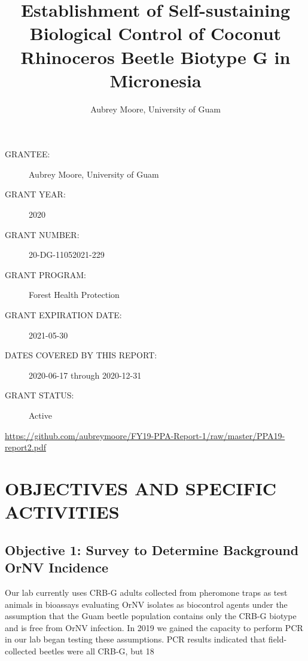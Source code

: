 \documentclass[12pt,letterpaper,english,bibliography=totocnumbered,abstract=on]{scrartcl}
\begin{document}
\titlehead{US Forest Service Forest Health Protection Grant Progess Report 1}
\title{Establishment of Self-sustaining Biological Control of Coconut Rhinoceros Beetle Biotype G in Micronesia}
\author{Aubrey Moore, University of Guam}
\maketitle
\begin{description}	
	\item[GRANTEE:] Aubrey Moore, University of Guam 
	\item[GRANT YEAR:] 2020
	\item[GRANT NUMBER:] 20-DG-11052021-229
	\item[GRANT PROGRAM:] Forest Health Protection
	\item[GRANT EXPIRATION DATE:] 2021-05-30
	\item[DATES COVERED BY THIS REPORT:] 2020-06-17 through 2020-12-31
	\item[GRANT STATUS:] Active
\end{description}	

\begin{footnotesize}
\url{https://github.com/aubreymoore/FY19-PPA-Report-1/raw/master/PPA19-report2.pdf}
\end{footnotesize}


\newpage{}
\tableofcontents{}

\newpage
\listoftodos

\newpage


\section{OBJECTIVES AND SPECIFIC ACTIVITIES} 


\subsection{Objective 1:  Survey to Determine Background OrNV Incidence} 

Our lab currently uses CRB-G adults collected from pheromone traps as test animals in bioassays evaluating OrNV isolates as biocontrol agents under the assumption that the Guam beetle population contains only the CRB-G biotype and is free from OrNV infection. In 2019 we gained the capacity to perform PCR in our lab began testing these assumptions. PCR results indicated that field-collected beetles were all CRB-G, but 18%
\end{document}
